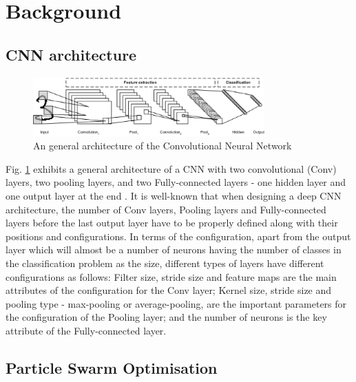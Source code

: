 \documentclass[conference]{IEEEtran}
\begin{document}
\section{Background}\label{sec:Background}

\subsection{CNN architecture}\label{sec:CNNArchitecture}

\begin{figure}[!t]
	\centering
	\includegraphics[width=3.5in]{cnn_architecture}
	\caption{An general architecture of the Convolutional Neural Network \cite{CNNFig:Tim}}
	\label{fig:CNNArchitecture}
\end{figure}

Fig. \ref{fig:CNNArchitecture} exhibits a general architecture of a CNN with two convolutional (Conv) layers, two pooling layers, and two Fully-connected layers - one hidden layer and one output layer at the end \cite{CNNFig:Tim}. It is well-known that when designing a deep CNN architecture, the number of Conv layers, Pooling layers and Fully-connected layers before the last output layer have to be properly defined along with their positions and configurations. In terms of the configuration, apart from the output layer which will almost be a number of neurons having the number of classes in the classification problem as the size, different types of layers have different configurations as follows: Filter size, stride size and feature maps are the main attributes of the configuration for the Conv layer; Kernel size, stride size and pooling type - max-pooling or average-pooling, are the important parameters for the configuration of the Pooling layer; and the number of neurons is the key attribute of the Fully-connected layer. %

\subsection{Particle Swarm Optimisation}
\end{document}
